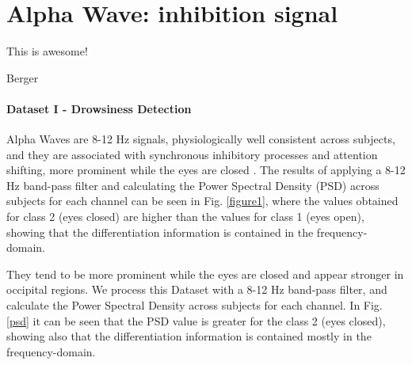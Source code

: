 \chapter{Alpha Wave: inhibition signal}

\epigraph{This is awesome!}{Berger}


\subsubsection{Dataset I - Drowsiness Detection}


Alpha Waves are 8-12 Hz signals, physiologically well consistent across subjects, and they are associated with synchronous inhibitory processes and attention shifting, more prominent while the eyes are closed \cite{c3}. The results of applying a 8-12 Hz band-pass filter and calculating the Power Spectral Density (PSD) across subjects for each channel can be seen in Fig. \ref{figure1}, where the values obtained for class 2 (eyes closed) are higher than the values for class 1 (eyes open), showing that the differentiation information is contained in the frequency-domain.
 
They tend to be more prominent while the eyes are closed and appear stronger in occipital regions. We process this Dataset with a 8-12 Hz band-pass filter, and calculate the Power Spectral Density across subjects for each channel.  In Fig. \ref{psd} it can be seen that the PSD value is greater for the class 2 (eyes closed), showing also that the differentiation information is contained mostly in the frequency-domain.




